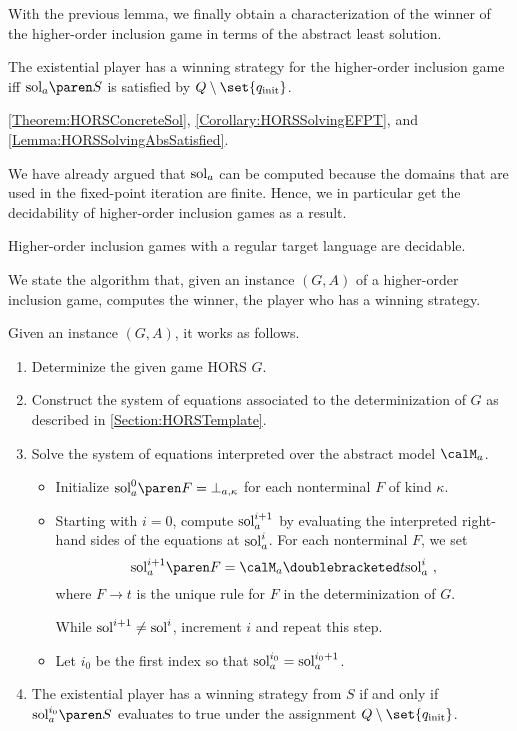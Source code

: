 \documentclass[../../diss.tex]{subfiles}
\begin{document}
With the previous lemma, we finally obtain a characterization of the winner of the higher-order inclusion game in terms of the abstract least solution.

\begin{theorem}
    The existential player has a winning strategy for the higher-order inclusion game iff $\sola{S}$ is satisfied by $Q \setminus \set{\qinit}$.
\end{theorem}

\begin{shortproof}
    \cref{Theorem:HORSConcreteSol}, \cref{Corollary:HORSSolvingEFPT}, and \cref{Lemma:HORSSolvingAbsSatisfied}.
\end{shortproof}

We have already argued that $\sola$ can be computed because the domains that are used in the fixed-point iteration are finite.
Hence, we in particular get the decidability of higher-order inclusion games as a result.

\begin{corollary}
    Higher-order inclusion games with a regular target language are decidable.
\end{corollary}

We state the algorithm that, given an instance $(G,A)$ of a higher-order inclusion game, computes the winner, \ie the player who has a winning strategy.

Given an instance $(G,A)$, it works as follows.

\begin{enumerate}
    \item
        Determinize the given game HORS $G$.
    \item
        Construct the system of equations associated to the determinization of $G$ as described in \cref{Section:HORSTemplate}.
    \item
        Solve the system of equations interpreted over the abstract model $\modela$.
        \begin{itemize}
            \item
                Initialize $\sola{0}{F} = \bota{\kappa}$ for each nonterminal $F$ of kind $\kappa$.
            \item
                Starting with $i = 0$, compute $\text{sol}_{a}^{i+1}$ by evaluating the interpreted right-hand sides of the equations at $\text{sol}_{a}^{i}$.
                For each nonterminal $F$, we set
                \[
                    \sola{i+1}{F} = \sema{t}{\solai{i}}
                    \ ,
                \]
                where $F \to t$ is the unique rule for $F$ in the determinization of $G$.

                While $\text{sol}^{i+1} \neq \text{sol}^{i}$, increment $i$ and repeat this step.
            \item
                Let $i_0$ be the first index so that $\text{sol}_{a}^{i_0} = \text{sol}_{a}^{i_0 + 1}$.
        \end{itemize}
    \item
        The existential player has a winning strategy from $S$ if and only if $\sola{i_0}{S}$ evaluates to true under the assignment $Q \setminus \set{\qinit}$.
\end{enumerate}
\end{document}

